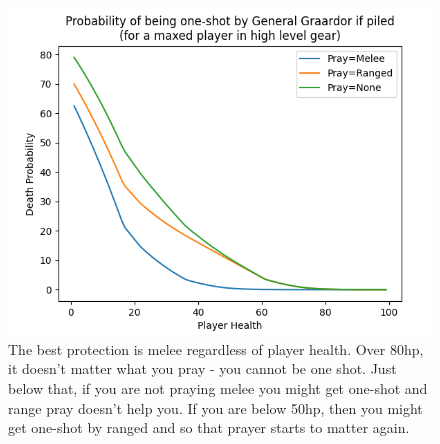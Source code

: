 	\begin{figure}
		\centering
		\includegraphics[width=\linewidth]{img/combat/bandos_one_shot.png}
		\caption{
			The best protection is melee regardless of player health. Over 80hp, it doesn't matter what you pray - you cannot be one shot. Just below that, if you are not praying melee you might get one-shot and range pray doesn't help you. If you are below 50hp, then you might get one-shot by ranged and so that prayer starts to matter again.
		}
		\label{fig:bandos_one_shot}
	\end{figure}